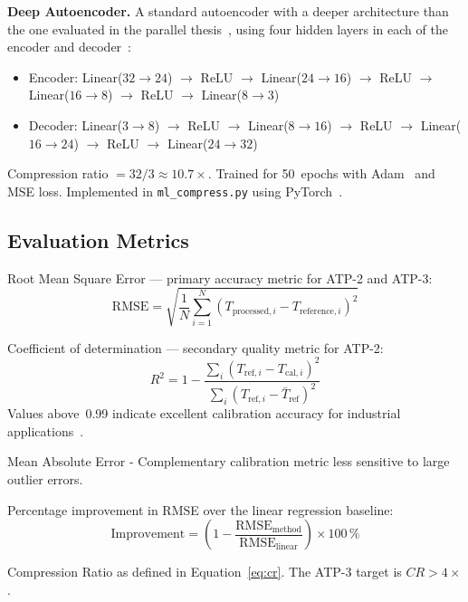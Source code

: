\textbf{Deep Autoencoder.} A standard autoencoder with a deeper architecture than the one evaluated in the parallel thesis~\cite{sravya2026}, using four hidden layers in each of the encoder and decoder~\cite{autoencoder_compression}:
\begin{itemize}[nosep]
\item Encoder: Linear($32\!\to\!24$) $\to$ ReLU $\to$ Linear($24\!\to\!16$) $\to$ ReLU $\to$ Linear($16\!\to\!8$) $\to$ ReLU $\to$ Linear($8\!\to\!3$)
\item Decoder: Linear($3\!\to\!8$) $\to$ ReLU $\to$ Linear($8\!\to\!16$) $\to$ ReLU $\to$ Linear($16\!\to\!24$) $\to$ ReLU $\to$ Linear($24\!\to\!32$)
\end{itemize}
Compression ratio $= 32/3 \approx 10.7\times$. Trained for 50~epochs with Adam~\cite{kingma2014adam} and MSE loss. Implemented in \texttt{ml\_compress.py} using PyTorch~\cite{pytorch}.

\subsection{Evaluation Metrics}
\label{subsec:metrics}

\begin{description}[leftmargin=2em, itemsep=2pt]
\item[RMSE] Root Mean Square Error --- primary accuracy metric for ATP-2 and ATP-3:
\begin{equation}
\text{RMSE} = \sqrt{\frac{1}{N}\sum_{i=1}^{N}(T_{\text{processed},i} - T_{\text{reference},i})^2}
\end{equation}

\item[$R^2$] Coefficient of determination --- secondary quality metric for ATP-2:
\begin{equation}
R^2 = 1 - \frac{\sum_i(T_{\text{ref},i} - T_{\text{cal},i})^2}{\sum_i(T_{\text{ref},i} - \bar{T}_{\text{ref}})^2}
\end{equation}
Values above~0.99 indicate excellent calibration accuracy for industrial applications~\cite{online_pyrometry_calibration}.

\item[MAE] Mean Absolute Error - Complementary calibration metric less sensitive to large outlier errors.

\item[Improvement~(\%)] Percentage improvement in RMSE over the linear regression baseline:
\begin{equation}
\text{Improvement} = \left(1 - \frac{\text{RMSE}_{\text{method}}}{\text{RMSE}_{\text{linear}}}\right) \times 100\,\%
\end{equation}

\item[CR] Compression Ratio as defined in Equation~\eqref{eq:cr}. The ATP-3 target is $CR > 4\times$.
\end{description}

